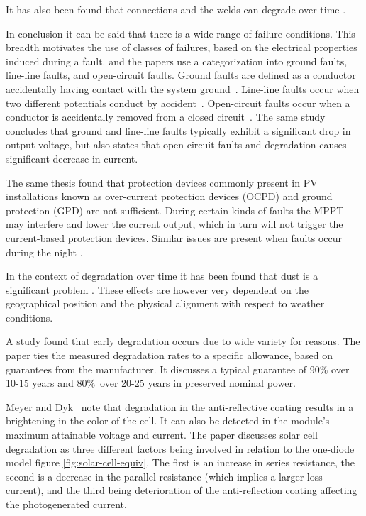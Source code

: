It has also been found that connections and the welds can degrade over time \cite{Houssein2010}.

In conclusion it can be said that there is a wide range of failure conditions.
This breadth motivates the use of classes of failures, based on the electrical properties induced during a fault.
\cite{Zhao2010thesis} and the papers \cite{Zhao2012tree,Zhao2013graph,Zhao2013outlier} use a categorization into ground faults, line-line faults, and open-circuit faults.
Ground faults are defined as a conductor accidentally having contact with the system ground~\cite{Zhao2010thesis}.
Line-line faults occur when two different potentials conduct by accident~\cite{Zhao2010thesis}.
Open-circuit faults occur when a conductor is accidentally removed from a closed circuit~\cite{Zhao2010thesis}.
The same study concludes that ground and line-line faults typically exhibit a significant drop in output voltage,
but also states that open-circuit faults and degradation causes significant decrease in current.

The same thesis found that protection devices commonly present in PV installations known as over-current protection devices (OCPD) and ground protection (GPD) are not sufficient.
During certain kinds of faults the MPPT may interfere and lower the current output, which in turn will not trigger the current-based protection devices.
Similar issues are present when faults occur during the night \cite{Zhao2010night}.

In the context of degradation over time it has been found that dust is a significant problem \cite{Mani2010}.
These effects are however very dependent on the geographical position and the physical alignment with respect to weather conditions.

A study \cite{Munoz2011} found that early degradation occurs due to wide variety for reasons.
The paper ties the measured degradation rates to a specific allowance, based on guarantees from the manufacturer.
It discusses a typical guarantee of $90\%$ over 10-15 years and $80\%$ over 20-25 years in preserved nominal power.

Meyer and Dyk~\cite{Meyer2004} note that degradation in the anti-reflective coating results in a brightening in the color of the cell.
It can also be detected in the module's maximum attainable voltage and current.
The paper discusses solar cell degradation as three different factors being involved in relation to the one-diode model figure \ref{fig:solar-cell-equiv}.
The first is an increase in series resistance, the second is a decrease in the parallel resistance (which implies a larger loss current), and the third being deterioration of the anti-reflection coating affecting the photogenerated current.

